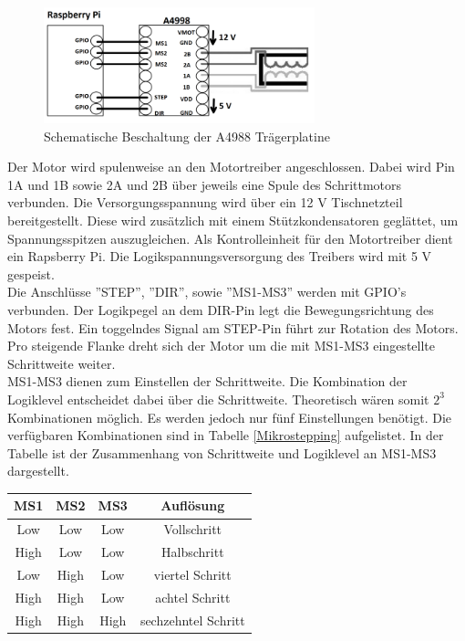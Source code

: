 \begin{figure}[H]
	\centering
	\includegraphics[width=0.7\textwidth]{images/Hardware/A4988}
	\caption{Schematische Beschaltung der A4988 Trägerplatine}
	\label{A4988}
\end{figure}


Der Motor wird spulenweise an den Motortreiber angeschlossen. Dabei wird Pin 1A und 1B sowie 2A und 2B über jeweils eine Spule des Schrittmotors verbunden.
Die Versorgungsspannung wird über ein 12 V Tischnetzteil bereitgestellt. Diese wird zusätzlich mit einem Stützkondensatoren geglättet, um Spannungsspitzen auszugleichen.
Als Kontrolleinheit für den Motortreiber dient ein Rapsberry Pi. Die Logikspannungsversorgung des Treibers wird mit 5 V gespeist.\\
Die Anschlüsse ''STEP'', ''DIR'', sowie ''MS1-MS3'' werden mit \ac{GPIO}’s verbunden. Der Logikpegel an dem DIR-Pin legt die Bewegungsrichtung des Motors fest. Ein toggelndes Signal am STEP-Pin führt zur Rotation des Motors. Pro steigende Flanke dreht sich der Motor um die mit MS1-MS3 eingestellte Schrittweite weiter. \\ 
MS1-MS3 dienen zum Einstellen der Schrittweite. Die Kombination der Logiklevel entscheidet dabei über die Schrittweite. Theoretisch wären somit $2^{3}$ Kombinationen möglich. Es werden jedoch nur fünf Einstellungen benötigt. Die verfügbaren Kombinationen sind in Tabelle \ref{Mikrostepping} aufgelistet. In der Tabelle ist der Zusammenhang von Schrittweite und Logiklevel an MS1-MS3 dargestellt. 


\begin{center}
	\begin{tabular} [H] {|c|c|c|c|}
		\hline
		\textbf{MS1} & \textbf{MS2}	& \textbf{MS3} 		& \textbf{Auflösung} \\ \hline
		Low & Low	& Low		& Vollschritt\\ \hline
		High & Low 	& Low  		& Halbschritt	\\ \hline
		Low & High  & Low 		& viertel Schritt 	\\ \hline
		High & High	& Low 		& achtel Schritt 	\\ \hline
		High & High	 &  High	& sechzehntel Schritt	\\\hline
	
		\end {tabular}
		\label{Mikrostepping}
	\end{center}



